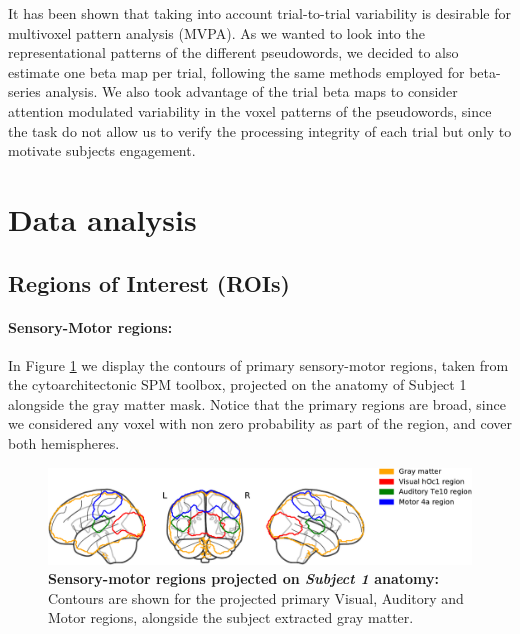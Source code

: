 It has been shown that taking into account trial-to-trial variability is desirable for multivoxel pattern analysis (MVPA)\citep{abdulrahman2016effect, mumford2012deconvolving}.
As we wanted to look into the representational patterns of the different pseudowords, we decided to also estimate one beta map per trial, following the same methods employed for beta-series analysis\citep{cisler2014comparison}.
We also took advantage of the trial beta maps to consider attention modulated variability in the voxel patterns of the pseudowords, since the task do not allow us to verify the processing integrity of each trial but only to motivate subjects engagement.


\section{Data analysis}

\subsection{Regions of Interest (ROIs)}

\paragraph{Sensory-Motor regions:}
In Figure \ref{fig:sensory_example_img} we display the contours of primary sensory-motor regions, taken from the cytoarchitectonic SPM toolbox\citep{eickhoff2005new}, projected on the anatomy of Subject 1 alongside the gray matter mask.
Notice that the primary regions are broad, since we considered any voxel with non zero probability as part of the region, and cover both hemispheres.


\begin{figure}[hptb]
\centering
\includegraphics[width=1.0 \linewidth]{figures/part_II/sensory_example_img_with_legend.pdf}
\caption{\textbf{Sensory-motor regions projected on \emph{Subject 1} anatomy:}
Contours are shown for the projected primary Visual, Auditory and Motor regions, alongside the subject extracted gray matter.
}
\label{fig:sensory_example_img}
\end{figure}



